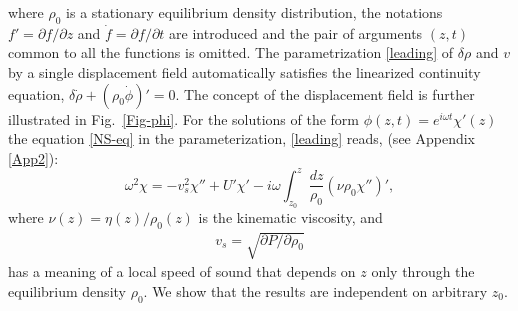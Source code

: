where $\rho_0$ is a stationary equilibrium density distribution, the notations $f' = \partial f/ \partial z$ and $\dot{f} = \partial f / \partial t$ are introduced and the pair of arguments $(z,t)$ common to all the functions is omitted.  
The parametrization \eqref{leading} of $\delta \rho$ and $v$ by a single displacement field automatically satisfies the linearized continuity equation, $\delta \dot{\rho} + (\rho_0 \dot{\phi})' = 0$.
The concept of the displacement field is further illustrated in Fig.~\ref{Fig-phi}. For the solutions of the form $\phi(z,t) = e^{i \omega t} \chi'(z)$ the equation \eqref{NS-eq} in the parameterization, \eqref{leading} reads, (see Appendix \ref{App2}):
\begin{equation}\label{normal-modes-eq}
\omega^2\chi=-v^2_s\chi''+U'\chi' -i\omega\int^{z}_{z_0}\frac{dz}{\rho_0}(\nu \rho_0 \chi'')',
\end{equation}
where $\nu(z)=\eta(z)/\rho_0(z)$ is the kinematic viscosity, and
\begin{align}\label{v_s}
v_s=\sqrt{\partial P/\partial\rho_0}
\end{align}
has a meaning of a local speed of sound that depends on $z$ only through the equilibrium density $\rho_0$. We show that the results are independent on arbitrary $z_0$.

